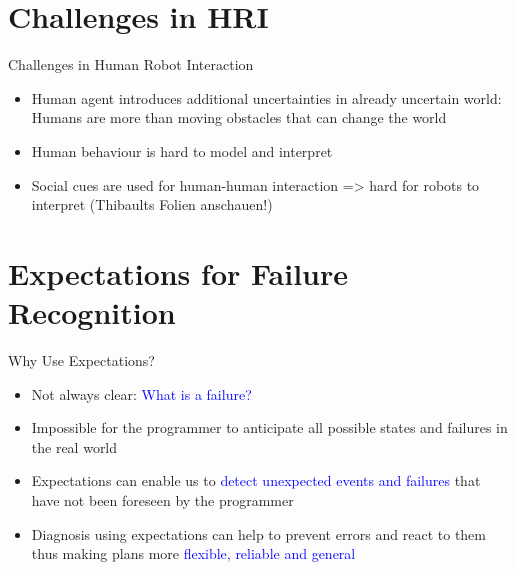 \documentclass{beamer}
\begin{document}
\section[HRI]{Challenges in HRI}

\begin{frame}{Challenges in Human Robot Interaction}
  \begin{itemize}
  \item Human agent introduces additional uncertainties in already uncertain world: Humans are more than moving obstacles that can change the world
  \item Human behaviour is hard to model and interpret
  \item Social cues are used for human-human interaction => hard for robots to interpret (Thibaults Folien anschauen!)
  \end{itemize}
\end{frame}

\section[Expectations]{Expectations for Failure Recognition}

\begin{frame}{Why Use Expectations?}
  \begin{itemize}
  \item Not always clear: \textcolor{blue}{What is a failure?}
  \item Impossible for the programmer to anticipate all possible states and failures in the real world
  \item Expectations can enable us to \textcolor{blue}{detect unexpected events and failures} that have not been foreseen by the programmer
  \item Diagnosis using expectations can help to prevent errors and react to them thus making plans more \textcolor{blue}{flexible, reliable and general}
  \end{itemize}
\end{frame}
\end{document}

